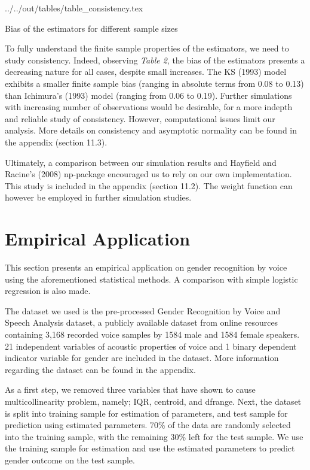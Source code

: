 \begin{table}[H]
\centering
 {../../out/tables/table_consistency.tex}
\caption {Bias of the estimators for different sample sizes} \label{tab:Bias of the estimators}
\end{table}
To fully understand the finite sample properties of the estimators, we need to study consistency. Indeed, observing \textit{Table 2}, the bias of the estimators presents a decreasing nature for all cases, despite small increases. The KS (1993) \cite{[12]} model exhibits a smaller finite sample bias (ranging in absolute terms from 0.08 to 0.13) than Ichimura's (1993) \citep{[6]} model (ranging from 0.06 to 0.19). Further simulations with increasing number of observations would be desirable, for a more indepth and reliable study of consistency. However, computational issues limit our analysis. More details on consistency and asymptotic normality can be found in the appendix (section 11.3).

Ultimately, a comparison between our simulation results and Hayfield and \break Racine's (2008) np-package \cite{[28]} encouraged us to rely on our own implementation. This study is included in the appendix (section 11.2). The weight function can however be employed in further simulation studies. 

\section{Empirical Application} %
\label{sec:Empirical Application}

This section presents an empirical application on gender recognition by voice using the aforementioned statistical methods. A comparison with simple logistic regression is also made. 

The dataset we used is the pre-processed Gender Recognition by Voice and Speech Analysis dataset, a publicly available dataset from online resources containing 3,168 recorded voice samples by 1584 male and 1584 female speakers. 21 independent variables of acoustic properties of voice and 1 binary dependent indicator variable for gender are included in the dataset. More information regarding the dataset can be found in the appendix.  

As a first step, we removed three variables that have shown to cause multicollinearity problem,  namely; IQR, centroid, and dfrange. Next, the dataset is split into training sample for estimation of parameters, and test sample for prediction using estimated parameters. 70\% of the data are randomly selected into the training sample, with the remaining 30\% left for the test sample. We use the training sample for estimation and use the estimated parameters to predict gender outcome on the test sample.

